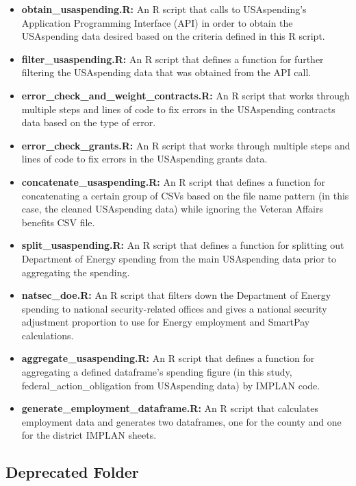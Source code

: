 \documentclass[
]{book}
\providecommand{\tightlist}{%
  \setlength{\itemsep}{0pt}\setlength{\parskip}{0pt}}
\begin{document}
\begin{itemize}
\tightlist
\item
  \textbf{obtain\_usaspending.R:} An R script that calls to USAspending's Application Programming Interface (API) in order to obtain the USAspending data desired based on the criteria defined in this R script.
\item
  \textbf{filter\_usaspending.R:} An R script that defines a function for further filtering the USAspending data that was obtained from the API call.
\item
  \textbf{error\_check\_and\_weight\_contracts.R:} An R script that works through multiple steps and lines of code to fix errors in the USAspending contracts data based on the type of error.
\item
  \textbf{error\_check\_grants.R:} An R script that works through multiple steps and lines of code to fix errors in the USAspending grants data.
\item
  \textbf{concatenate\_usaspending.R:} An R script that defines a function for concatenating a certain group of CSVs based on the file name pattern (in this case, the cleaned USAspending data) while ignoring the Veteran Affairs benefits CSV file.
\item
  \textbf{split\_usaspending.R:} An R script that defines a function for splitting out Department of Energy spending from the main USAspending data prior to aggregating the spending.
\item
  \textbf{natsec\_doe.R:} An R script that filters down the Department of Energy spending to national security-related offices and gives a national security adjustment proportion to use for Energy employment and SmartPay calculations.
\item
  \textbf{aggregate\_usaspending.R:} An R script that defines a function for aggregating a defined dataframe's spending figure (in this study, federal\_action\_obligation from USAspending data) by IMPLAN code.
\item
  \textbf{generate\_employment\_dataframe.R:} An R script that calculates employment data and generates two dataframes, one for the county and one for the district IMPLAN sheets.
\end{itemize}

\hypertarget{deprecated-script}{%
\subsection{Deprecated Folder}\label{deprecated-script}}
\end{document}
